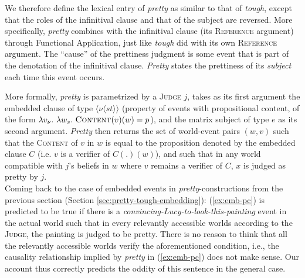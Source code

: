 \documentclass[11pt]{article}
\begin{document}
We therefore define the lexical entry of \textit{{pretty}} as similar to that of \textit{{tough}}, except that the roles of the infinitival clause and that of the subject are reversed. More specifically, \textit{{pretty}} combines with the infinitival clause (its \textsc{Reference} argument) through Functional Application, just like \textit{tough} did with its own \textsc{Reference} argument. The ``cause'' of the prettiness judgment is some event that is part of the denotation of the infinitival clause. \textit{Pretty} states the prettiness of its \textit{subject} each time this event occurs. 
\begin{center}
\end{center}
More formally, \textit{pretty} is parametrized by a \textsc{Judge} $j$, takes as its first argument the embedded clause of type $\langle \nu \langle st\rangle\rangle$ (property of events with propositional content, of the form $\lambda v_\nu . \ \lambda w_s. \ \textsc{Content}(v)(w) = p$), and the matrix subject of type $e$ as its second argument. \textit{Pretty} then returns the set of world-event pairs $(w, v)$ such that the \textsc{Content} of $v$ in $w$ is equal to the proposition denoted by the embedded clause $C$ (i.e. $v$ is a verifier of $C(.)(w)$), and such that in any world compatible with $j$'s beliefs in $w$ where $v$ remains a verifier of $C$, $x$ is judged as pretty by $j$.\\


Coming back to the case of embedded events in \textit{pretty}-constructions from the previous section (Section \ref{sec:pretty-tough-embedding}):
(\ref{ex:emb-pc}) is predicted to be true if there is a \textit{convincing-Lucy-to-look-this-painting} event in the actual world such that in every relevantly accessible worlds according to the \textsc{Judge}, the painting is judged to be pretty. There is no reason to think that all the relevantly accessible worlds verify the aforementioned condition, i.e., the causality relationship implied by \textit{pretty} in (\ref{ex:emb-pc}) does not make sense. Our account thus correctly predicts the oddity of this sentence in the general case.
\end{document}
